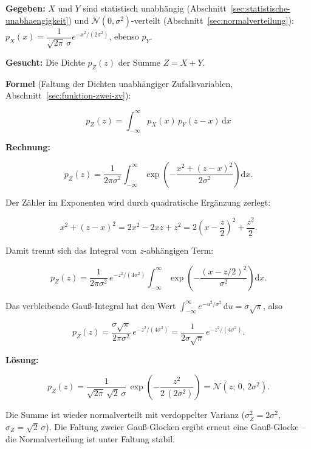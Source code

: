 \begin{beispiel}

\textbf{Gegeben:} $X$ und $Y$ sind statistisch unabhängig
(Abschnitt~\ref{sec:statistische-unabhaengigkeit}) und
$\mathcal{N}(0,\sigma^2)$-verteilt (Abschnitt~\ref{sec:normalverteilung}):
$p_X(x) = \dfrac{1}{\sqrt{2\pi}\,\sigma} e^{-x^2/(2\sigma^2)}$, ebenso $p_Y$.

\textbf{Gesucht:} Die Dichte $p_Z(z)$ der Summe $Z = X + Y$.

\textbf{Formel} (Faltung der Dichten unabhängiger Zufallsvariablen,
Abschnitt~\ref{sec:funktion-zwei-zv}):

$$
p_Z(z) = \int_{-\infty}^{\infty} p_X(x)\, p_Y(z - x)\,\mathrm{d}x
$$

\textbf{Rechnung:}

$$
p_Z(z) = \frac{1}{2\pi\sigma^2}\int_{-\infty}^{\infty}
\exp\!\left(-\frac{x^2 + (z-x)^2}{2\sigma^2}\right)\mathrm{d}x.
$$

Der Zähler im Exponenten wird durch quadratische Ergänzung zerlegt:

$$
x^2 + (z-x)^2 = 2x^2 - 2xz + z^2
= 2\left(x - \frac{z}{2}\right)^2 + \frac{z^2}{2}.
$$

Damit trennt sich das Integral vom $z$-abhängigen Term:

$$
p_Z(z) = \frac{1}{2\pi\sigma^2}\, e^{-z^2/(4\sigma^2)}
\int_{-\infty}^{\infty} \exp\!\left(-\frac{(x - z/2)^2}{\sigma^2}\right)\mathrm{d}x.
$$

Das verbleibende Gauß-Integral hat den Wert
$\int_{-\infty}^{\infty} e^{-u^2/\sigma^2}\,\mathrm{d}u = \sigma\sqrt{\pi}$, also

$$
p_Z(z) = \frac{\sigma\sqrt{\pi}}{2\pi\sigma^2}\, e^{-z^2/(4\sigma^2)}
= \frac{1}{2\sigma\sqrt{\pi}}\, e^{-z^2/(4\sigma^2)}.
$$

\textbf{Lösung:}

$$
\boxed{\;p_Z(z) = \frac{1}{\sqrt{2\pi}\,\sqrt{2}\,\sigma}\,
\exp\!\left(-\frac{z^2}{2\,(2\sigma^2)}\right)
= \mathcal{N}(z;\, 0,\, 2\sigma^2).\;}
$$

Die Summe ist wieder normalverteilt mit verdoppelter Varianz
($\sigma_Z^2 = 2\sigma^2$, $\sigma_Z = \sqrt{2}\,\sigma$). Die Faltung zweier
Gauß-Glocken ergibt erneut eine Gauß-Glocke -- die Normalverteilung ist unter
Faltung stabil.

\end{beispiel}

